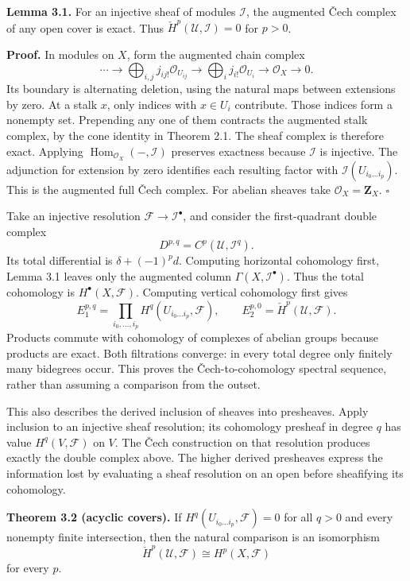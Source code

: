 \documentclass[11pt]{article}
\begin{document}
\textbf{Lemma 3.1.} For an injective sheaf of modules \(\mathcal I\),
the augmented Čech complex of any open cover is exact. Thus
\(\check H^p(\mathcal U,\mathcal I)=0\) for \(p>0\).

\textbf{Proof.} In modules on \(X\), form the augmented chain complex \[
\cdots\to
\bigoplus_{i,j}j_{ij!}\mathcal O_{U_{ij}}
\to\bigoplus_i j_{i!}\mathcal O_{U_i}
\to\mathcal O_X\to0.
\] Its boundary is alternating deletion, using the natural maps between
extensions by zero. At a stalk \(x\), only indices with \(x\in U_i\)
contribute. Those indices form a nonempty set. Prepending any one of
them contracts the augmented stalk complex, by the cone identity in
Theorem 2.1. The sheaf complex is therefore exact. Applying
\(\operatorname{Hom}_{\mathcal O_X}(-,\mathcal I)\) preserves exactness
because \(\mathcal I\) is injective. The adjunction for extension by
zero identifies each resulting factor with
\(\mathcal I(U_{i_0\ldots i_p})\). This is the augmented full Čech
complex. For abelian sheaves take \(\mathcal O_X=\mathbf Z_X\).
\(\square\)

Take an injective resolution \(\mathcal F\to\mathcal I^\bullet\), and
consider the first-quadrant double complex \[
D^{p,q}=C^p(\mathcal U,\mathcal I^q).
\] Its total differential is \(\delta+(-1)^p d\). Computing horizontal
cohomology first, Lemma 3.1 leaves only the augmented column
\(\Gamma(X,\mathcal I^\bullet)\). Thus the total cohomology is
\(H^\bullet(X,\mathcal F)\). Computing vertical cohomology first gives
\[
E_1^{p,q}=\prod_{i_0,\ldots,i_p}
H^q(U_{i_0\ldots i_p},\mathcal F),
\qquad E_2^{p,0}=\check H^p(\mathcal U,\mathcal F).
\] Products commute with cohomology of complexes of abelian groups
because products are exact. Both filtrations converge: in every total
degree only finitely many bidegrees occur. This proves the
Čech-to-cohomology spectral sequence, rather than assuming a comparison
from the outset.

This also describes the derived inclusion of sheaves into presheaves.
Apply inclusion to an injective sheaf resolution; its cohomology
presheaf in degree \(q\) has value \(H^q(V,\mathcal F)\) on \(V\). The
Čech construction on that resolution produces exactly the double complex
above. The higher derived presheaves express the information lost by
evaluating a sheaf resolution on an open before sheafifying its
cohomology.

\textbf{Theorem 3.2 (acyclic covers).} If
\(H^q(U_{i_0\ldots i_p},\mathcal F)=0\) for all \(q>0\) and every
nonempty finite intersection, then the natural comparison is an
isomorphism \[
\check H^p(\mathcal U,\mathcal F)\cong H^p(X,\mathcal F)
\] for every \(p\).
\end{document}

